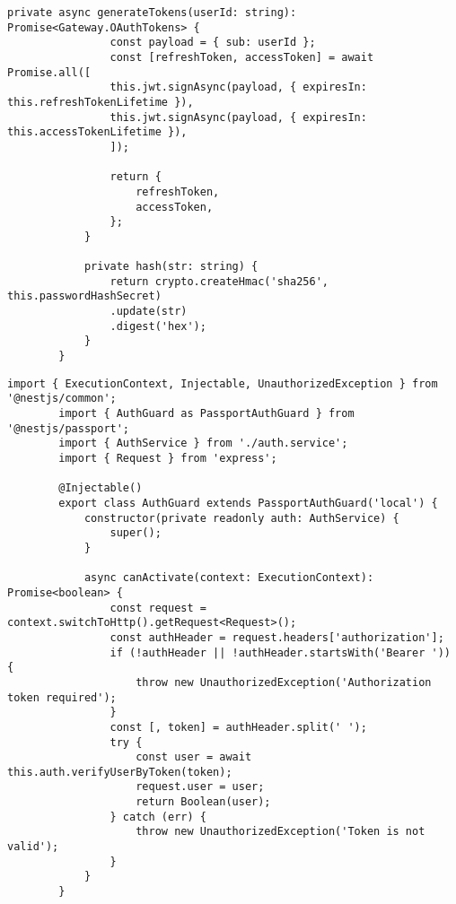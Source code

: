 \begin{lstlisting}[caption={auth.service.ts}]
	 		private async generateTokens(userId: string): Promise<Gateway.OAuthTokens> {
	 			const payload = { sub: userId };
	 			const [refreshToken, accessToken] = await Promise.all([
	 			this.jwt.signAsync(payload, { expiresIn: this.refreshTokenLifetime }),
	 			this.jwt.signAsync(payload, { expiresIn: this.accessTokenLifetime }),
	 			]);
	 			
	 			return {
	 				refreshToken,
	 				accessToken,
	 			};
	 		}
	 		
	 		private hash(str: string) {
	 			return crypto.createHmac('sha256', this.passwordHashSecret)
	 			.update(str)
	 			.digest('hex');
	 		}
	 	}
	 \end{lstlisting}
	 
	 \begin{lstlisting}[caption={auth.guard.ts}]
		import { ExecutionContext, Injectable, UnauthorizedException } from '@nestjs/common';
		import { AuthGuard as PassportAuthGuard } from '@nestjs/passport';
		import { AuthService } from './auth.service';
		import { Request } from 'express';
		
		@Injectable()
		export class AuthGuard extends PassportAuthGuard('local') {
			constructor(private readonly auth: AuthService) {
				super();
			}    
			
			async canActivate(context: ExecutionContext): Promise<boolean> {
				const request = context.switchToHttp().getRequest<Request>();
				const authHeader = request.headers['authorization'];
				if (!authHeader || !authHeader.startsWith('Bearer ')) {
					throw new UnauthorizedException('Authorization token required');
				}
				const [, token] = authHeader.split(' ');
				try {
					const user = await this.auth.verifyUserByToken(token);
					request.user = user;
					return Boolean(user);
				} catch (err) {
					throw new UnauthorizedException('Token is not valid');
				}
			}
		}
	 \end{lstlisting}

